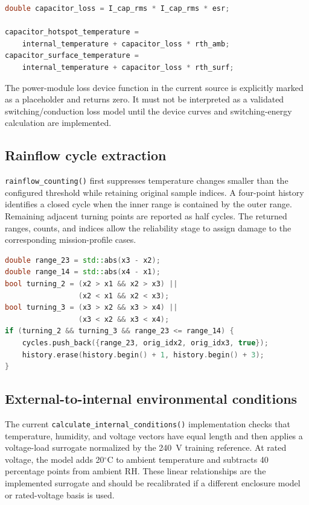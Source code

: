 \documentclass{article}
\begin{document}
\begin{lstlisting}[language=C++,caption={GPU capacitor loss and surface/hotspot temperature calculation}]
double capacitor_loss = I_cap_rms * I_cap_rms * esr;

capacitor_hotspot_temperature =
    internal_temperature + capacitor_loss * rth_amb;
capacitor_surface_temperature =
    internal_temperature + capacitor_loss * rth_surf;
\end{lstlisting}

The power-module loss device function in the current source is explicitly marked
as a placeholder and returns zero.  It must not be interpreted as a validated
switching/conduction loss model until the device curves and switching-energy
calculation are implemented.

\subsection{Rainflow cycle extraction}
\label{sec:implementation-rainflow}
\texttt{rainflow\_counting()} first suppresses temperature changes smaller than
the configured threshold while retaining original sample indices.  A four-point
history identifies a closed cycle when the inner range is contained by the outer
range.  Remaining adjacent turning points are reported as half cycles.  The
returned ranges, counts, and indices allow the reliability stage to assign damage
to the corresponding mission-profile cases.

\begin{lstlisting}[language=C++,caption={Four-point rainflow cycle test}]
double range_23 = std::abs(x3 - x2);
double range_14 = std::abs(x4 - x1);
bool turning_2 = (x2 > x1 && x2 > x3) ||
                 (x2 < x1 && x2 < x3);
bool turning_3 = (x3 > x2 && x3 > x4) ||
                 (x3 < x2 && x3 < x4);
if (turning_2 && turning_3 && range_23 <= range_14) {
    cycles.push_back({range_23, orig_idx2, orig_idx3, true});
    history.erase(history.begin() + 1, history.begin() + 3);
}
\end{lstlisting}

\subsection{External-to-internal environmental conditions}
\label{sec:implementation-environment}
The current \texttt{calculate\_internal\_conditions()} implementation checks
that temperature, humidity, and voltage vectors have equal length and then
applies a voltage-load surrogate normalized by the 240~V training reference.
At rated voltage, the model adds 20$^\circ$C to ambient temperature and subtracts
40 percentage points from ambient RH.  These linear relationships are the
implemented surrogate and should be recalibrated if a different enclosure model
or rated-voltage basis is used.
\end{document}
